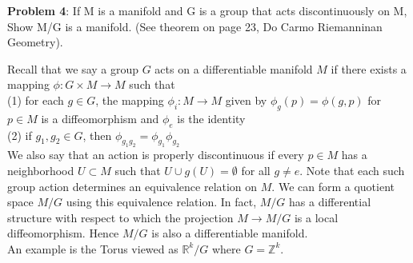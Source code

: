 \documentclass[12pt,letterpaper,cm]{hmcpset}
\begin{document}
\textbf{Problem 4}: If M is a manifold and G is a group that acts discontinuously on M, Show M/G is a manifold. (See theorem on page 23, Do Carmo Riemanninan Geometry).

\begin{solution}
Recall that we say a group $G$ acts on a differentiable manifold $M$ if there exists a mapping $\phi: G \times M \to M$ such that \\
(1) for each $g\in G$, the mapping $\phi_i: M \to M$ given by $\phi_g(p) = \phi(g, p)$ for $p \in M$ is a diffeomorphism and $\phi_e$ is the identity \\
(2) if $g_1, g_2 \in G$, then $\phi_{g_1g_2} = \phi_{g_1} \phi_{g_2}$ \\
We also say that an action is properly discontinuous if every $p \in M$ has a neighborhood $U \subset M$ such that $U \cup g(U) = \emptyset$ for all $g \neq e$. Note that each such group action determines an equivalence relation on $M$. We can form a quotient space $M/G$ using this equivalence relation. In fact, $M/G$ has a differential structure with respect to which the projection $M \to M/G$ is a local diffeomorphism. Hence $M/G$ is also a differentiable manifold.  \\
An example is the Torus viewed as $\mathbb{R}^k/G$ where $G = \mathbb{Z}^k$.

\end{solution}
\end{document}
